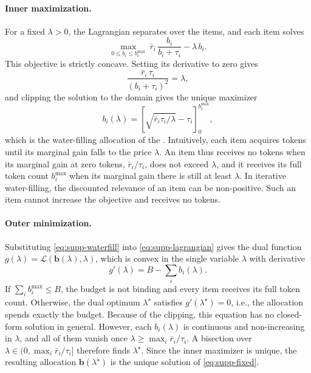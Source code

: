 \paragraph{Inner maximization.}
For a fixed $\lambda>0$, the Lagrangian separates over the items, and each item solves
\begin{equation}
  \max_{0\le b_i\le b_i^{\max}}\ \bar r_i\,\frac{b_i}{b_i+\tau_i}-\lambda\,b_i .
\label{eq:supp-item}
\end{equation}
This objective is strictly concave. Setting its derivative to zero gives
\begin{equation}
  \frac{\bar r_i\,\tau_i}{(b_i+\tau_i)^2}=\lambda ,
\label{eq:supp-stationarity}
\end{equation}
and clipping the solution to the domain gives the unique maximizer
\begin{equation}
  b_i(\lambda)=\left[\sqrt{\bar r_i\tau_i/\lambda}-\tau_i\right]_0^{b_i^{\max}} ,
\label{eq:supp-waterfill}
\end{equation}
which is the water-filling allocation of the \mainpaper. Intuitively, each item acquires tokens until its marginal gain falls to the price $\lambda$. An item thus receives no tokens when its marginal gain at zero tokens, $\bar r_i/\tau_i$, does not exceed $\lambda$, and it receives its full token count $b_i^{\max}$ when its marginal gain there is still at least $\lambda$. In iterative water-filling, the discounted relevance of an item can be non-positive. Such an item cannot increase the objective and receives no tokens.

\paragraph{Outer minimization.}
Substituting \cref{eq:supp-waterfill} into \cref{eq:supp-lagrangian} gives the dual function $g(\lambda)=\mathcal L(\mathbf b(\lambda),\lambda)$, which is convex in the single variable $\lambda$ with derivative
\begin{equation}
  g'(\lambda)=B-\sum_i b_i(\lambda) .
\label{eq:supp-dual}
\end{equation}
If $\sum_i b_i^{\max}\le B$, the budget is not binding and every item receives its full token count. Otherwise, the dual optimum $\lambda^\star$ satisfies $g'(\lambda^\star)=0$, i.e., the allocation spends exactly the budget. Because of the clipping, this equation has no closed-form solution in general. However, each $b_i(\lambda)$ is continuous and non-increasing in $\lambda$, and all of them vanish once $\lambda\ge\max_i\bar r_i/\tau_i$. A bisection over $\lambda\in(0,\max_i\bar r_i/\tau_i]$ therefore finds $\lambda^\star$. Since the inner maximizer is unique, the resulting allocation $\mathbf b(\lambda^\star)$ is the unique solution of \cref{eq:supp-fixed}.

